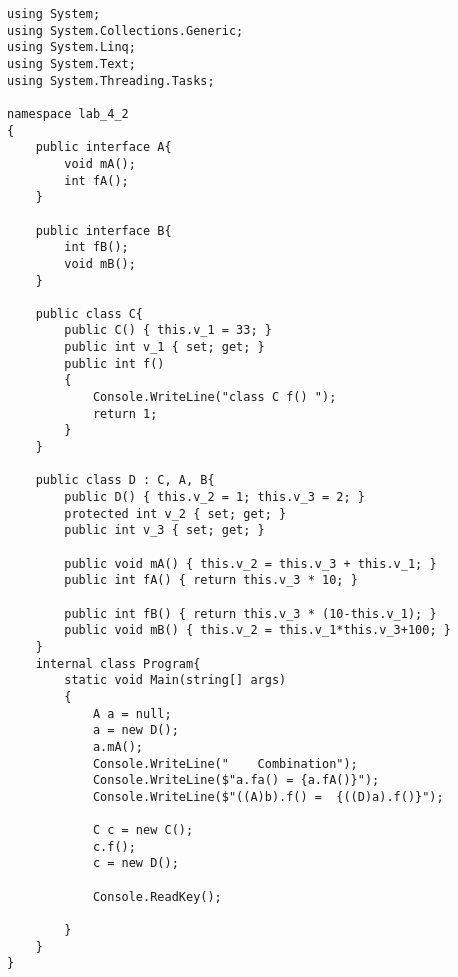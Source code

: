 \begin{lstlisting}[language={[Sharp]C}]
using System;
using System.Collections.Generic;
using System.Linq;
using System.Text;
using System.Threading.Tasks;

namespace lab_4_2
{
    public interface A{
        void mA();
        int fA();
    }

    public interface B{
        int fB();
        void mB();
    }

    public class C{
        public C() { this.v_1 = 33; }
        public int v_1 { set; get; }
        public int f()
        {
            Console.WriteLine("class C f() ");
            return 1;
        }
    }

    public class D : C, A, B{
        public D() { this.v_2 = 1; this.v_3 = 2; }
        protected int v_2 { set; get; }
        public int v_3 { set; get; }

        public void mA() { this.v_2 = this.v_3 + this.v_1; }
        public int fA() { return this.v_3 * 10; }

        public int fB() { return this.v_3 * (10-this.v_1); }
        public void mB() { this.v_2 = this.v_1*this.v_3+100; }
    }
    internal class Program{
        static void Main(string[] args)
        {
            A a = null;
            a = new D();
            a.mA();
            Console.WriteLine("    Combination");
            Console.WriteLine($"a.fa() = {a.fA()}");
            Console.WriteLine($"((A)b).f() =  {((D)a).f()}");

            C c = new C();
            c.f();
            c = new D();

            Console.ReadKey();

        }
    }
}

\end{lstlisting}
